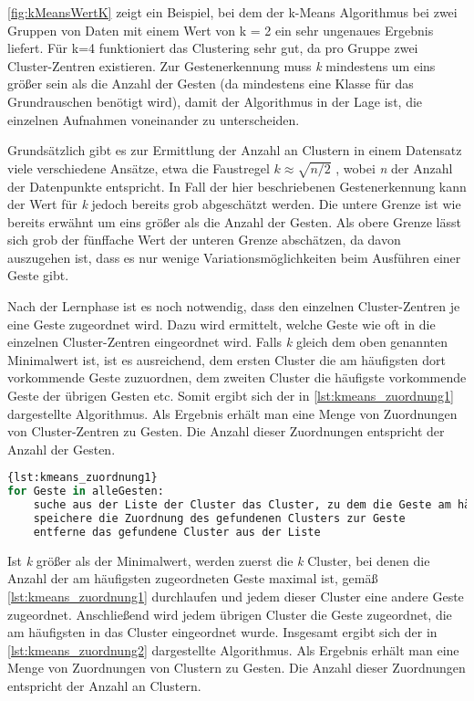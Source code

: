 \autoref{fig:kMeansWertK} zeigt ein Beispiel, bei dem der k-Means Algorithmus bei zwei Gruppen von Daten mit einem Wert von k = 2 ein sehr ungenaues Ergebnis liefert. Für k=4 funktioniert das Clustering sehr gut, da pro Gruppe zwei Cluster-Zentren existieren. %
Zur Gestenerkennung muss \emph{k} mindestens um eins größer sein als die Anzahl der Gesten (da mindestens eine Klasse für das Grundrauschen benötigt wird),
damit der Algorithmus in der Lage ist, die einzelnen Aufnahmen voneinander zu unterscheiden.  


Grundsätzlich gibt es zur Ermittlung der Anzahl an Clustern in einem Datensatz viele verschiedene Ansätze, etwa die Faustregel $k \approx \sqrt{n/2}$ \cite{WikipediaKMeansKValue}, wobei \emph{n} der Anzahl der Datenpunkte entspricht. In Fall der hier beschriebenen Gestenerkennung kann der Wert für \emph{k} jedoch bereits grob abgeschätzt werden. 
Die untere Grenze ist wie bereits erwähnt um eins größer als die Anzahl der Gesten.
Als obere Grenze lässt sich grob der fünffache Wert der unteren Grenze abschätzen, da davon auszugehen ist, dass es nur wenige Variationsmöglichkeiten beim Ausführen einer Geste gibt.

Nach der Lernphase ist es noch notwendig, dass den einzelnen Cluster-Zentren je eine Geste zugeordnet wird. Dazu wird ermittelt, welche Geste wie oft in die einzelnen Cluster-Zentren eingeordnet wird. Falls \emph{k} gleich dem oben genannten Minimalwert ist, ist es ausreichend, dem ersten Cluster die am häufigsten dort vorkommende Geste zuzuordnen, dem zweiten Cluster die häufigste vorkommende Geste der übrigen Gesten etc. 
Somit ergibt sich der in 
\autoref{lst:kmeans_zuordnung1}
dargestellte Algorithmus.
Als Ergebnis erhält man eine Menge von Zuordnungen von Cluster-Zentren zu Gesten. Die Anzahl dieser Zuordnungen entspricht der Anzahl der Gesten.

\begin{lstlisting}[language=Python,caption={Zuordnung von Cluster-Zentrum zu Geste, Variante 1},label={lst:kmeans_zuordnung1}]{lst:kmeans_zuordnung1}
for Geste in alleGesten:
    suche aus der Liste der Cluster das Cluster, zu dem die Geste am häufigsten zugeordnet wird
    speichere die Zuordnung des gefundenen Clusters zur Geste
    entferne das gefundene Cluster aus der Liste
\end{lstlisting}

Ist \emph{k} größer als der Minimalwert, werden zuerst die \emph{k} Cluster, bei denen die Anzahl der am häufigsten zugeordneten Geste maximal ist, gemäß 
\autoref{lst:kmeans_zuordnung1} durchlaufen und jedem dieser Cluster eine andere Geste zugeordnet. Anschließend wird jedem übrigen Cluster die Geste zugeordnet, die am häufigsten in das Cluster eingeordnet wurde.
Insgesamt ergibt sich der in \autoref{lst:kmeans_zuordnung2} dargestellte Algorithmus.  Als Ergebnis erhält man eine Menge von Zuordnungen von Clustern zu Gesten. Die Anzahl dieser Zuordnungen entspricht der Anzahl an Clustern.

